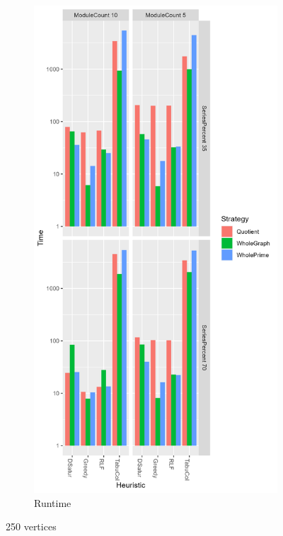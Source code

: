 \documentclass[a4paper]{article}
\begin{document}
\begin{figure}[p]
\begin{subfigure}{.4\paperwidth}
    \end{subfigure}%
    \begin{subfigure}{.4\paperwidth}
        \includegraphics[width=\columnwidth]{Tables/250Time.png}
      \caption{Runtime}
      \label{fig:250t}
    \end{subfigure}
\caption{250 vertices}
\label{fig:250}
\end{figure}
\end{document}
